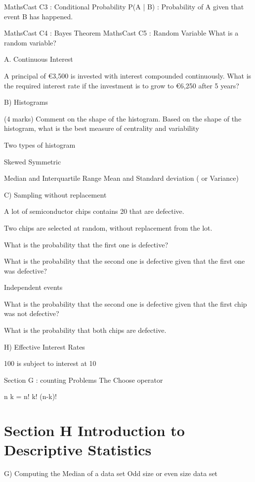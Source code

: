 MathsCast C3 : Conditional Probability
    P(A | B)  : Probability of A given that event B has happened.
 
MathsCast C4 : Bayes Theorem
MathsCast C5 : Random Variable
What is a random variable? 
 
 
A. Continuous Interest

A principal of €3,500 is invested with interest compounded continuously.
What is the required interest rate if the investment is to grow to \euro 6,250 after 5
years?

B) Histograms

(4 marks) Comment on the shape of the histogram. Based on the shape of the
histogram, what is the best measure of centrality and variability

Two types of histogram

Skewed
Symmetric

Median and Interquartile Range
Mean and Standard deviation ( or Variance)


C) Sampling without replacement

A lot of semiconductor chips contains 20 that are defective.

Two chips are selected at random, without replacement from the lot.


What is the probability that the first one is defective?

What is the probability that the second one is defective given that the first one was defective?

Independent events

What is the probability that the second one is defective given that the first chip was not defective?

What is the probability that both chips are defective.


H) Effective Interest Rates

100 is subject to interest at 10%



Section G : counting Problems
The Choose operator

{n \choose k}  = {n! \over k! (n-k)!} 

\section*{Section H Introduction to Descriptive Statistics}
G) Computing the Median of a data set
Odd size or even size data set

